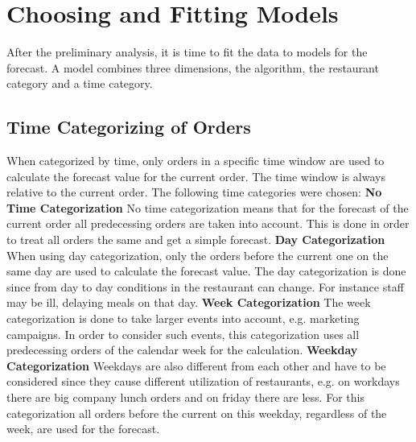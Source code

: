 \section{Choosing and Fitting Models}\label{Choosing and Fitting Models}
After the preliminary analysis, it is time to fit the data to models for the forecast. A model combines three dimensions, the algorithm, the restaurant category and a time category.
\subsection{Time Categorizing of Orders}\label{subsection:Categorizing by Order}
When categorized by time, only orders in a specific time window are used to calculate the forecast value for the current order. The time window is always relative to the current order. The following time categories were chosen:
\newline\newline\textbf{No Time Categorization}\newline
No time categorization means that for the forecast of the current order all predecessing orders are taken into account. This is done in order to treat all orders the same and get a simple forecast.
\newline\newline\textbf{Day Categorization}\newline
When using day categorization, only the orders before the current one on the same day are used to calculate the forecast value. The day categorization is done since from day to day conditions in the restaurant can change. For instance staff may be ill, delaying meals on that day.
\newline\newline\textbf{Week Categorization}\newline
The week categorization is done to take larger events into account, e.g. marketing campaigns. In order to consider such events, this categorization uses all predecessing orders of the calendar week for the calculation.
\newline\newline\textbf{Weekday Categorization}\newline
Weekdays are also different from each other and have to be considered since they cause different utilization of restaurants, e.g. on workdays there are big company lunch orders and on friday there are less. For this categorization all orders before the current on this weekday, regardless of the week, are used for the forecast.
